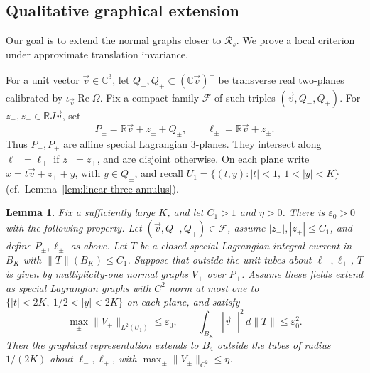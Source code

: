 \documentclass[11pt,a4paper]{article}
\numberwithin{equation}{section}
\newtheorem{lemma}[theorem]{Lemma}
\theoremstyle{definition}
\theoremstyle{remark}
\newcommand{\R}{\mathbb R}
\newcommand{\C}{\mathbb C}
\newcommand{\Ree}{\operatorname{Re}}
\newcommand{\dd}{\,d}
\begin{document}
	\subsection{Qualitative graphical extension}
	
	Our goal is to extend the normal graphs closer to $\mathcal R_s$.
	We prove a local criterion under approximate translation invariance.
	
	For a unit vector $\vec v\in\C^3$, let
	$Q_-,Q_+\subset(\C\vec v)^\perp$ be transverse real two-planes
	calibrated by $\iota_{\vec v}\Ree\Omega$.
	Fix a compact family $\mathcal F$ of such triples $(\vec v,Q_-,Q_+)$.
	For $z_-,z_+\in\R J\vec v$, set
	\[
	P_\pm=\R\vec v+z_\pm+Q_\pm,\qquad
	\ell_\pm=\R\vec v+z_\pm.
	\]
	Thus $P_-,P_+$ are affine special Lagrangian 3-planes. They intersect
	along $\ell_-=\ell_+$ if $z_-=z_+$, and are disjoint otherwise.
	On each plane write $x=t\vec v+z_\pm+y$, with $y\in Q_\pm$, and
	recall $U_1=\{(t,y):|t|<1,\ 1<|y|<K\}$
	(cf.\ Lemma~\ref{lem:linear-three-annulus}).
	
	\begin{lemma}\label{lem:qualitative-continuation}
		Fix a sufficiently large $K$, and let $C_1>1$ and $\eta>0$.
		There is $\varepsilon_0>0$ with
		the following property. Let $(\vec v,Q_-,Q_+)\in\mathcal F$, assume
		$|z_-|,|z_+|\le C_1$, and define $P_\pm,\ell_\pm$ as above.
		Let $T$ be a closed special Lagrangian integral current in $B_K$ with
		$\|T\|(B_K)\le C_1$. Suppose that outside the unit tubes
		about $\ell_-,\ell_+$, $T$ is given by multiplicity-one normal graphs
		$V_\pm$ over $P_\pm$. Assume these fields extend as special Lagrangian
		graphs with $C^2$ norm at most one to
		$\{|t|<2K,\ 1/2<|y|<2K\}$ on each plane, and satisfy
		\[
		\max_\pm\|V_\pm\|_{L^2(U_1)}\le\varepsilon_0,\qquad
		\int_{B_K}|\vec v^\perp|^2\dd\|T\|\le\varepsilon_0^2.
		\]
		Then the graphical representation extends to $B_4$ outside the tubes of radius $1/(2K)$
		about $\ell_-,\ell_+$, with
		$\max_\pm\|V_\pm\|_{C^2}\le\eta$.
	\end{lemma}
	
\end{document}
